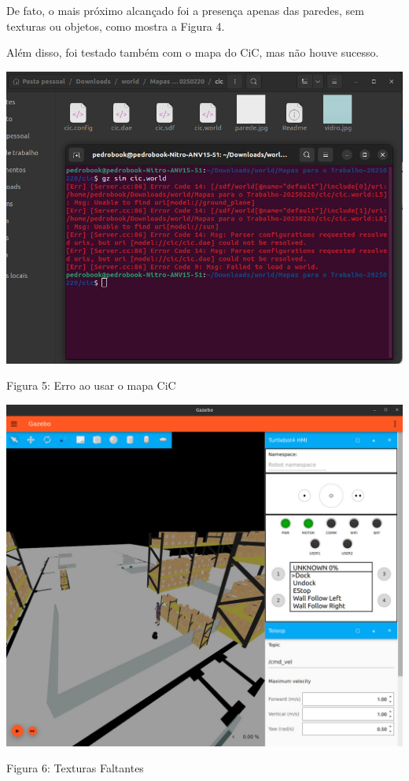 \documentclass[a4 paper]{article}
\begin{document}
De fato,  o mais próximo alcançado foi a presença apenas das paredes, sem texturas ou objetos, como mostra a Figura 4.


Além disso, foi testado também com o mapa do CiC, mas não houve sucesso.


\begin{table}[h]
\centering
\includegraphics[scale=0.4]{figuras/cicerror}
\end{table}
\begin{center}
Figura 5: Erro ao usar o mapa CiC
\end{center}\vspace{30pt}

\begin{table}[h]
\centering
\includegraphics[scale=0.173]{figuras/errogazebo}
\end{table}
\begin{center}
Figura 6: Texturas Faltantes
\end{center}
\end{document}
